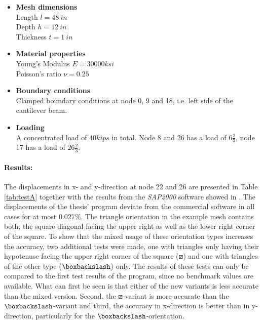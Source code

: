    \begin{itemize}
   \item \textbf{Mesh dimensions}\\
   Length $l = 48\ in$\\
   Depth $h = 12\ in$\\
   Thickness $t = 1\ in$
   
   \item \textbf{Material properties}\\
   Young's Modulus $E = 30000 ksi$\\
   Poisson's ratio $\nu = 0.25$
   
   \item \textbf{Boundary conditions}\\
   Clamped boundary conditions at node 0, 9 and 18, i.e. left side of the cantilever beam.
   
   \item \textbf{Loading}\\
   A concentrated load of $40 kips$ in total. Node 8 and 26 has a load of $6 \frac{2}{3}$, node 17 has a load of $26 \frac{2}{3}$.
   \end{itemize}
   
   \paragraph{Results:} The displacements in x- and y-direction at node 22 and 26 are presented in Table \ref{tab:testA} together with the results from the \textit{SAP2000} software showed in \cite{kansara2004development}. The displacements of the thesis' program deviate from the commercial software in all cases for at most $0.027\%$. The triangle orientation in the example mesh contains both, the square diagonal facing the upper right as well as the lower right corner of the square. To show that the mixed usage of these orientation types increases the accuracy, two additional tests were made, one with triangles only having their hypotenuse facing the upper right corner of the square ($\boxslash$) and one with triangles of the other type ($\boxbackslash$) only. The results of these tests can only be compared to the first test results of the program, since no benchmark values are available. What can first be seen is that either of the new variants is less accurate than the mixed version. Second, the $\boxslash$-variant is more accurate than the $\boxbackslash$-variant and third, the accuracy in x-direction is better than in y-direction, particularly for the $\boxbackslash$-orientation.
   
